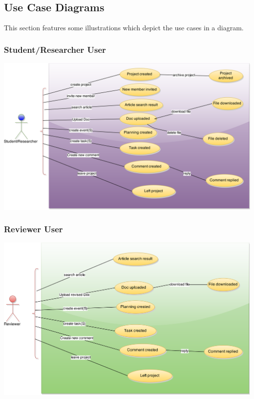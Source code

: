 \subsection{Use Case Diagrams} %
This section features some illustrations which depict the use cases in a diagram.
\subsubsection{Student/Researcher User} 

\begin{center}
\centering
\includegraphics[scale=0.3]{./img/dsgn_img/USECASE1.png}	
\end{center}


\subsubsection{Reviewer User} 
\begin{center}
\includegraphics[scale=0.3]{./img/dsgn_img/USECASE2.png}
	
\end{center}

